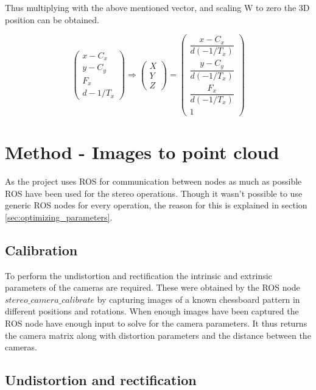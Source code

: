 Thus multiplying with the above mentioned vector, and scaling W to zero the 3D position can be obtained.

\[
 \begin{pmatrix}
  x - C_{x} \\
  y - C_{y} \\
  F_{x} \\
  d-1/T_{x} 
 \end{pmatrix}
 \Rightarrow
  \begin{pmatrix}  
  X\\
  Y\\
  Z
 \end{pmatrix}
 =
 \begin{pmatrix}
  \dfrac{x - C_{x}}{ d(-1/T_{x})}  \\
  \dfrac{y - C_{y} }{ d(-1/T_{x})}\\
  \dfrac{F_{x}}{ d(-1/T_{x})}\\
  1
 \end{pmatrix}
\]

\section{Method - Images to point cloud}

As the project uses ROS for communication between nodes as much as possible ROS have been used for the stereo operations. Though it wasn't possible to use generic ROS nodes for every operation, the reason for this is explained in section \ref{sec:optimizing_parameters}. 

\subsection{Calibration} \label{sec:calibration}

To perform the undistortion and rectification the intrinsic and extrinsic parameters of the cameras are required. These were obtained by the ROS node $stereo\_camera\_calibrate$ by capturing images of a known chessboard pattern in different positions and rotations. When enough images have been captured the ROS node have enough input to solve for the camera parameters. It thus returns the camera matrix along with distortion parameters and the distance between the cameras.


\subsection{Undistortion and rectification}

